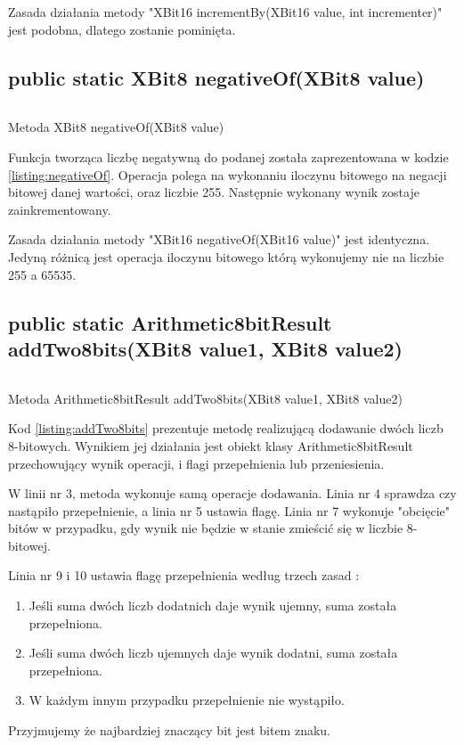Zasada działania metody "XBit16 incrementBy(XBit16 value, int incrementer)" jest podobna, dlatego zostanie pominięta.

\subsection{public static XBit8 negativeOf(XBit8 value)}
\begin{listing}[h]
	\inputminted{java}{listings/xbit/negativeOf.java}
	\caption{Metoda XBit8 negativeOf(XBit8 value)}
	\label{listing:negativeOf}
\end{listing}
Funkcja tworząca liczbę negatywną do podanej została zaprezentowana w kodzie \ref{listing:negativeOf}. Operacja polega na wykonaniu iloczynu bitowego na negacji bitowej danej wartości, oraz liczbie 255. Następnie wykonany wynik zostaje zainkrementowany. 

Zasada działania metody "XBit16 negativeOf(XBit16 value)" jest identyczna. Jedyną różnicą jest operacja iloczynu bitowego którą wykonujemy nie na liczbie 255 a 65535.

\subsection{public static Arithmetic8bitResult addTwo8bits(XBit8 value1, XBit8 value2)}
\begin{listing}[h]
	\inputminted{java}{listings/xbit/addTwo8bits.java}
	\caption{Metoda Arithmetic8bitResult addTwo8bits(XBit8 value1, XBit8 value2)}
	\label{listing:addTwo8bits}
\end{listing}
Kod \ref{listing:addTwo8bits} prezentuje metodę realizującą dodawanie dwóch liczb 8-bitowych. Wynikiem jej działania jest obiekt klasy Arithmetic8bitResult przechowujący wynik operacji, i flagi przepełnienia lub przeniesienia. 

W linii nr 3, metoda wykonuje samą operacje dodawania. Linia nr 4 sprawdza czy nastąpiło przepełnienie, a linia nr 5 ustawia flagę. Linia nr 7 wykonuje "obcięcie" bitów w przypadku, gdy wynik nie będzie w stanie zmieścić się w liczbie 8-bitowej. 

Linia nr 9 i 10 ustawia flagę przepełnienia według trzech zasad \cite{overflowRules}:
\begin{enumerate}
	\item Jeśli suma dwóch liczb dodatnich daje wynik ujemny, suma została przepełniona. 
	\item Jeśli suma dwóch liczb ujemnych daje wynik dodatni, suma została przepełniona.
	\item W każdym innym przypadku przepełnienie nie wystąpiło.
\end{enumerate}
Przyjmujemy że najbardziej znaczący bit jest bitem znaku.

